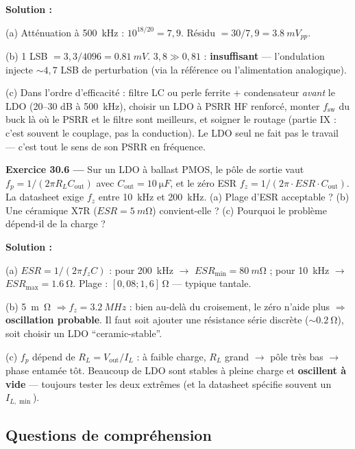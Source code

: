 \documentclass[12pt,a4paper,twoside]{book}
\begin{document}
\begin{pratique}
\textbf{Solution :}

(a) Atténuation à \SI{500}{kHz} : $10^{18/20} = 7{,}9$. Résidu $= 30/7{,}9 = \SI{3.8}{mV_{pp}}$.

(b) 1 LSB $= 3{,}3/4096 = \SI{0.81}{mV}$. $3{,}8 \gg 0{,}81$ : \textbf{insuffisant} --- l'ondulation injecte $\sim 4{,}7$ LSB de perturbation (via la référence ou l'alimentation analogique).

(c) Dans l'ordre d'efficacité : filtre LC ou perle ferrite + condensateur \textit{avant} le LDO (20--30 dB à \SI{500}{kHz}), choisir un LDO à PSRR HF renforcé, monter $f_{\text{sw}}$ du buck là où le PSRR et le filtre sont meilleurs, et soigner le routage (partie IX : c'est souvent le couplage, pas la conduction). Le LDO seul ne fait pas le travail --- c'est tout le sens de son PSRR en fréquence.
\end{pratique}

\textbf{Exercice 30.6 ---} Sur un LDO à ballast PMOS, le pôle de sortie vaut $f_p = 1/(2\pi R_L C_{\text{out}})$ avec $C_{\text{out}} = \SI{10}{\micro F}$, et le zéro ESR $f_z = 1/(2\pi\cdot ESR\cdot C_{\text{out}})$. La datasheet exige $f_z$ entre \SI{10}{kHz} et \SI{200}{kHz}. (a) Plage d'ESR acceptable ? (b) Une céramique X7R ($ESR = \SI{5}{m\ohm}$) convient-elle ? (c) Pourquoi le problème dépend-il de la charge ?

\begin{pratique}
\textbf{Solution :}

(a) $ESR = 1/(2\pi f_z C)$ : pour \SI{200}{kHz} $\to$ $ESR_{\min} = \SI{80}{m\ohm}$ ; pour \SI{10}{kHz} $\to$ $ESR_{\max} = \SI{1.6}{\ohm}$. Plage : $[0{,}08 ; 1{,}6]\,\si{\ohm}$ --- typique tantale.

(b) \SI{5}{m\ohm} $\Rightarrow f_z = \SI{3.2}{MHz}$ : bien au-delà du croisement, le zéro n'aide plus $\Rightarrow$ \textbf{oscillation probable}. Il faut soit ajouter une résistance série discrète ($\sim\SI{0.2}{\ohm}$), soit choisir un LDO ``ceramic-stable''.

(c) $f_p$ dépend de $R_L = V_{\text{out}}/I_L$ : à faible charge, $R_L$ grand $\to$ pôle très bas $\to$ phase entamée tôt. Beaucoup de LDO sont stables à pleine charge et \textbf{oscillent à vide} --- toujours tester les deux extrêmes (et la datasheet spécifie souvent un $I_{L,\min}$).
\end{pratique}

\subsection*{Questions de compréhension}
\end{document}

